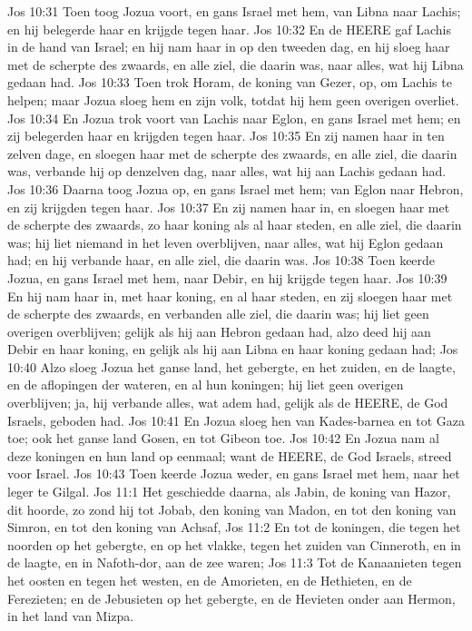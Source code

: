 Jos 10:31  Toen toog Jozua voort, en gans Israel met hem, van Libna naar Lachis; en hij belegerde haar en krijgde tegen haar.
Jos 10:32  En de HEERE gaf Lachis in de hand van Israel; en hij nam haar in op den tweeden dag, en hij sloeg haar met de scherpte des zwaards, en alle ziel, die daarin was, naar alles, wat hij Libna gedaan had.
Jos 10:33  Toen trok Horam, de koning van Gezer, op, om Lachis te helpen; maar Jozua sloeg hem en zijn volk, totdat hij hem geen overigen overliet.
Jos 10:34  En Jozua trok voort van Lachis naar Eglon, en gans Israel met hem; en zij belegerden haar en krijgden tegen haar.
Jos 10:35  En zij namen haar in ten zelven dage, en sloegen haar met de scherpte des zwaards, en alle ziel, die daarin was, verbande hij op denzelven dag, naar alles, wat hij aan Lachis gedaan had.
Jos 10:36  Daarna toog Jozua op, en gans Israel met hem; van Eglon naar Hebron, en zij krijgden tegen haar.
Jos 10:37  En zij namen haar in, en sloegen haar met de scherpte des zwaards, zo haar koning als al haar steden, en alle ziel, die daarin was; hij liet niemand in het leven overblijven, naar alles, wat hij Eglon gedaan had; en hij verbande haar, en alle ziel, die daarin was.
Jos 10:38  Toen keerde Jozua, en gans Israel met hem, naar Debir, en hij krijgde tegen haar.
Jos 10:39  En hij nam haar in, met haar koning, en al haar steden, en zij sloegen haar met de scherpte des zwaards, en verbanden alle ziel, die daarin was; hij liet geen overigen overblijven; gelijk als hij aan Hebron gedaan had, alzo deed hij aan Debir en haar koning, en gelijk als hij aan Libna en haar koning gedaan had;
Jos 10:40  Alzo sloeg Jozua het ganse land, het gebergte, en het zuiden, en de laagte, en de aflopingen der wateren, en al hun koningen; hij liet geen overigen overblijven; ja, hij verbande alles, wat adem had, gelijk als de HEERE, de God Israels, geboden had.
Jos 10:41  En Jozua sloeg hen van Kades-barnea en tot Gaza toe; ook het ganse land Gosen, en tot Gibeon toe.
Jos 10:42  En Jozua nam al deze koningen en hun land op eenmaal; want de HEERE, de God Israels, streed voor Israel.
Jos 10:43  Toen keerde Jozua weder, en gans Israel met hem, naar het leger te Gilgal.
Jos 11:1  Het geschiedde daarna, als Jabin, de koning van Hazor, dit hoorde, zo zond hij tot Jobab, den koning van Madon, en tot den koning van Simron, en tot den koning van Achsaf,
Jos 11:2  En tot de koningen, die tegen het noorden op het gebergte, en op het vlakke, tegen het zuiden van Cinneroth, en in de laagte, en in Nafoth-dor, aan de zee waren;
Jos 11:3  Tot de Kanaanieten tegen het oosten en tegen het westen, en de Amorieten, en de Hethieten, en de Ferezieten; en de Jebusieten op het gebergte, en de Hevieten onder aan Hermon, in het land van Mizpa.
